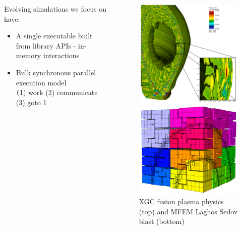 \documentclass[aspectratio=169]{beamer}
\begin{document}
\begin{frame}
\begin{columns}
\begin{column}{0.7\textwidth}
      Evolving simulations we focus on have:
      \begin{itemize}
        \item A single executable built from library APIs - in-memory
          interactions
        \item Bulk synchronous parallel execution model\\
          {\small \texttt (1) work (2) communicate (3) goto 1}
      \end{itemize}
    \end{column}
    \begin{column}{0.3\textwidth}
      \begin{figure}
        \centering
        \includegraphics[width=.75\textwidth]{figures/xgcCase.png} \\
        \includegraphics[width=.75\textwidth]{figures/laghos_sedov.png}\\
        \tiny{XGC fusion plasma physics (top) and MFEM Laghos Sedov blast
        (bottom)}
      \end{figure}
    \end{column}
  \end{columns}
\end{frame}
\end{document}
